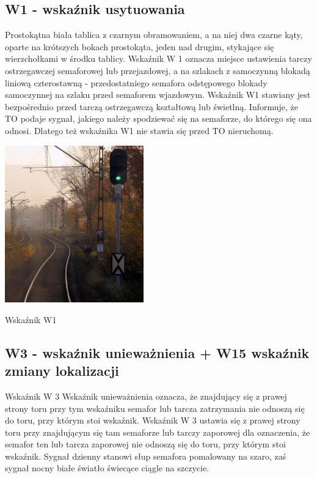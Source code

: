 \subsection{W1 - wskaźnik usytuowania}

Prostokątna biała tablica z czarnym obramowaniem, a na niej dwa czarne kąty, oparte na krótszych bokach prostokąta, jeden nad drugim, stykające się wierzchołkami w środku tablicy. Wskaźnik W 1 oznacza miejsce ustawienia tarczy ostrzegawczej semaforowej lub przejazdowej, a na szlakach z samoczynną blokadą liniową czterostawną - przedostatniego
semafora odstępowego blokady samoczynnej na szlaku przed semaforem wjazdowym. Wskaźnik W1 stawiany jest bezpośrednio przed tarczą ostrzegawczą kształtową lub świetlną. Informuje, że TO podaje sygnał, jakiego należy spodziewać się na semaforze, do którego się ona odnosi. Dlatego też wskaźnika W1 nie stawia się przed TO nieruchomą.

	\begin{marginfigure}
		\includegraphics[width=6cm]{skryptkierownik-img/skryptkierownik-img004.jpg}
		\caption{Wskaźnik W1}
	\end{marginfigure}

\subsection{W3 - wskaźnik unieważnienia + W15 wskaźnik zmiany lokalizacji}

Wskaźnik W 3 {\textquotedbl}Wskaźnik unieważnienia{\textquotedbl} oznacza, że znajdujący się z prawej strony toru przy
tym wskaźniku semafor lub tarcza zatrzymania nie odnoszą się do toru, przy którym stoi wskaźnik. Wskaźnik W 3 ustawia
się z prawej strony toru przy znajdującym się tam semaforze lub tarczy zaporowej dla oznaczenia, że semafor ten lub
tarcza zaporowej nie odnoszą się do toru, przy którym stoi wskaźnik. Sygnał dzienny stanowi słup semafora pomalowany na
szaro, zaś sygnał nocny białe światło świecące ciągle na szczycie.

